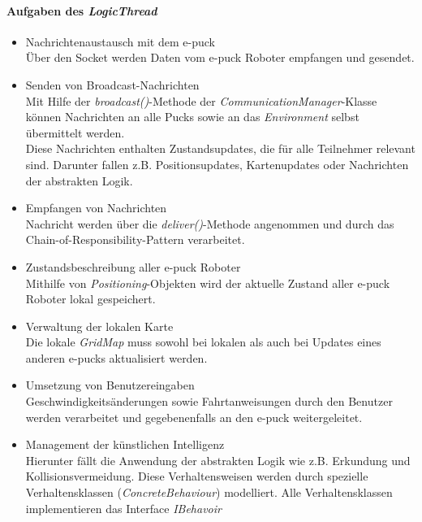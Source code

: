 \documentclass[10pt,a4paper]{article}
\begin{document}
			\paragraph*{Aufgaben des \textit{LogicThread}}
		\begin{itemize}
			\item Nachrichtenaustausch mit dem e-puck \\
				Über den Socket werden Daten vom e-puck Roboter empfangen und gesendet.
			\item Senden von Broadcast-Nachrichten \\
				Mit Hilfe der \textit{broadcast()}-Methode der \textit{CommunicationManager}-Klasse können Nachrichten an alle
				Pucks sowie an das \textit{Environment} selbst übermittelt werden. \\
				Diese Nachrichten enthalten	Zustandsupdates, die für alle Teilnehmer relevant sind. Darunter fallen z.B.
				Positionsupdates, Kartenupdates oder Nachrichten der abstrakten Logik.
			\item Empfangen von Nachrichten  \\
				Nachricht werden über die \textit{deliver()}-Methode angenommen und durch das Chain-of-Responsibility-Pattern verarbeitet.
			\item Zustandsbeschreibung aller e-puck Roboter \\
				Mithilfe von \textit{Positioning}-Objekten wird der aktuelle Zustand aller e-puck Roboter lokal gespeichert.
			\item Verwaltung der lokalen Karte \\
				Die lokale \textit{GridMap} muss sowohl bei lokalen als auch bei Updates eines anderen e-pucks aktualisiert werden. 
			\item Umsetzung von Benutzereingaben \\
				Geschwindigkeitsänderungen sowie Fahrtanweisungen durch den Benutzer werden verarbeitet und gegebenenfalls
				an den e-puck weitergeleitet.
			\item Management der künstlichen Intelligenz \\
				Hierunter fällt die Anwendung der abstrakten Logik wie z.B. Erkundung und Kollisionsvermeidung. Diese Verhaltensweisen werden durch
				spezielle Verhaltensklassen (\textit{ConcreteBehaviour}) modelliert. Alle Verhaltensklassen implementieren das Interface
				\textit{IBehavoir}
		\end{itemize} 
  		
\end{document}
